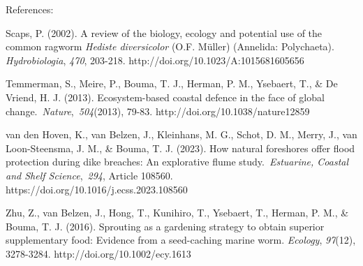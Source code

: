 \documentclass[authordate, empirical]{jote-new-article}
\begin{document}
	References:



	Scaps, P. (2002). A review of the biology, ecology and potential use of the common ragworm \emph{Hediste diversicolor }(O.F. Müller) (Annelida: Polychaeta). \emph{Hydrobiologia}, \emph{470}, 203-218. http://doi.org/10.1023/A:1015681605656



	Temmerman, S., Meire, P., Bouma, T. J., Herman, P. M., Ysebaert, T., \& De Vriend, H. J. (2013). Ecosystem-based coastal defence in the face of global change. \emph{Nature}, \emph{504}(2013), 79-83. http://doi.org/10.1038/nature12859



	van den Hoven, K., van Belzen, J., Kleinhans, M. G., Schot, D. M., Merry, J., van Loon-Steensma, J. M., \& Bouma, T. J. (2023). How natural foreshores offer flood protection during dike breaches: An explorative flume study. \emph{Estuarine, Coastal and Shelf Science}, \emph{294}, Article 108560. https://doi.org/10.1016/j.ecss.2023.108560



	Zhu, Z., van Belzen, J., Hong, T., Kunihiro, T., Ysebaert, T., Herman, P. M., \& Bouma, T. J. (2016). Sprouting as a gardening strategy to obtain superior supplementary food: Evidence from a seed-caching marine worm. \emph{Ecology}, \emph{97}(12), 3278-3284. http://doi.org/10.1002/ecy.1613
\end{document}
